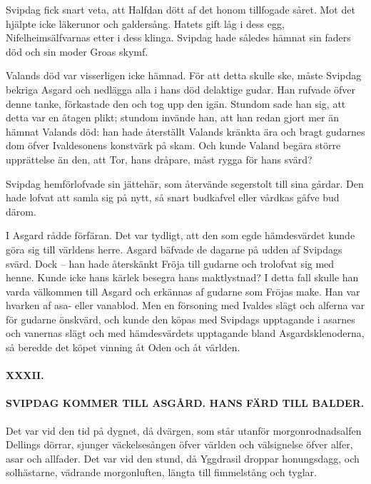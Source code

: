 Svipdag fick snart veta, att Halfdan dött af det honom tillfogade såret.
Mot det hjälpte icke läkerunor och galdersång. Hatets gift låg i dess
egg, Nifelheimsälfvarnas etter i dess klinga. Svipdag hade således
hämnat sin faders död och sin moder Groas skymf.

Valands död var visserligen icke hämnad. För att detta skulle ske, måste
Svipdag bekriga Asgard och nedlägga alla i hans död delaktige gudar. Han
rufvade öfver denne tanke, förkastade den och tog upp den igän. Stundom
sade han sig, att detta var en åtagen plikt; stundom invände han, att
han redan gjort mer än hämnat Valands död: han hade återställt Valands
kränkta ära och bragt gudarnes dom öfver Ivaldesonens konstvärk på skam.
Och kunde Valand begära större upprättelse än den, att Tor, hans
dråpare, måst rygga för hans svärd?

Svipdag hemförlofvade sin jättehär, som återvände segerstolt till sina
gårdar. Den hade lofvat att samla sig på nytt, så snart budkafvel eller
vårdkas gåfve bud därom.

I Asgard rådde förfäran. Det var tydligt, att den som egde hämdesvärdet
kunde göra sig till världens herre. Asgard bäfvade de dagarne på udden
af Svipdags svärd. Dock -- han hade återskänkt Fröja till gudarne och
trolofvat sig med henne. Kunde icke hans kärlek besegra hans
maktlystnad? I detta fall skulle han varda välkommen till Asgard och
erkännas\protect\hypertarget{lb1625905.xhtmlux5cux23start125}{}{}\protect\hypertarget{lb1625905.xhtmlux5cux23start125-a}{}{}\protect\hypertarget{lb1625905.xhtmlux5cux23start125-b}{}{}\protect\hypertarget{lb1625905.xhtmlux5cux23start125-c}{}{}\protect\hypertarget{lb1625905.xhtmlux5cux23start125-d}{}{}
af gudarne som Fröjas make. Han var hvarken af asa- eller vanablod. Men
en försoning med Ivaldes slägt och alferna var för gudarne önskvärd, och
kunde den köpas med Svipdags upptagande i asarnes och vanernas slägt och
med hämdesvärdets upptagande bland Asgardsklenoderna, så beredde det
köpet vinning åt Oden och åt världen.

\paragraph{XXXII.}

\paragraph{SVIPDAG KOMMER TILL ASGÅRD. HANS FÄRD TILL BALDER.}

Det var vid den tid på dygnet, då dvärgen, som står utanför
morgonrodnadsalfen Dellings dörrar, sjunger väckelsesången öfver världen
och välsignelse öfver alfer, asar och allfader. Det var vid den stund,
då Yggdrasil droppar honungsdagg, och solhästarne, vädrande
morgonluften, längta till fimmelstång och tyglar.

